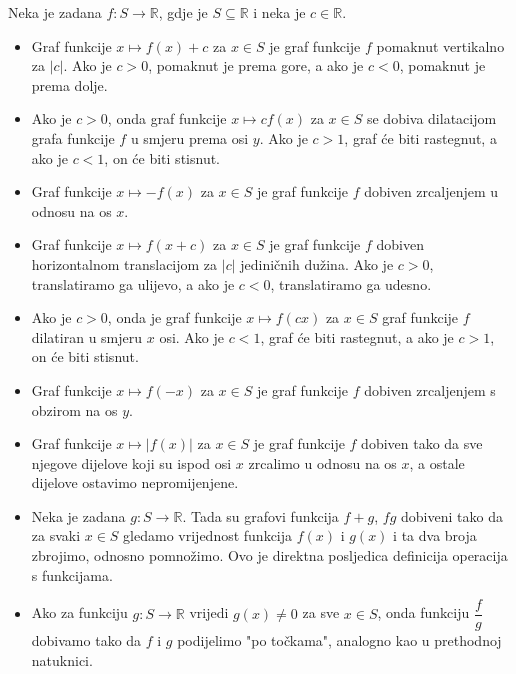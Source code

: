 \begin{remark}
\label{graphrem}
Neka je zadana \(f : S\to \mathbb{R}\), gdje je \(S\subseteq \mathbb{R}\) i neka je \(c\in \mathbb{R}\).
\begin{itemize}
\item Graf funkcije \(x\mapsto f(x)+c\) za \(x\in S\) je graf funkcije \(f\) pomaknut vertikalno za \(|c|\). Ako je \(c>0\), pomaknut je prema gore, a ako je \(c<0\), pomaknut je prema dolje.
\item Ako je \(c>0\), onda graf funkcije \(x\mapsto cf(x)\) za \(x\in S\) se dobiva dilatacijom grafa funkcije \(f\) u smjeru prema osi \(y\). Ako je \(c>1\), graf će biti rastegnut, a ako je \(c<1\), on će biti stisnut.
\item Graf funkcije \(x\mapsto -f(x)\) za \(x\in S\) je graf funkcije \(f\) dobiven zrcaljenjem u odnosu na os \(x\).
\item Graf funkcije \(x\mapsto f(x+c)\) za \(x\in S\) je graf funkcije \(f\) dobiven horizontalnom translacijom za \(|c|\) jediničnih dužina. Ako je \(c>0\), translatiramo ga ulijevo, a ako je \(c<0\), translatiramo ga udesno.
\item Ako je \(c>0\), onda je graf funkcije \(x\mapsto f(cx)\) za \(x\in S\) graf funkcije \(f\) dilatiran u smjeru \(x\) osi. Ako je \(c<1\), graf će biti rastegnut, a ako je \(c>1\), on će biti stisnut.
\item Graf funkcije \(x\mapsto f(-x)\) za \(x\in S\) je graf funkcije \(f\) dobiven zrcaljenjem s obzirom na os \(y\).
\item Graf funkcije \(x\mapsto |f(x)|\) za \(x\in S\) je graf funkcije \(f\) dobiven tako da sve njegove dijelove koji su ispod osi \(x\) zrcalimo u odnosu na os \(x\), a ostale dijelove ostavimo nepromijenjene.
\item Neka je zadana \(g : S\to \mathbb{R}\). Tada su grafovi funkcija \(f+g\), \(fg\) dobiveni tako da za svaki \(x\in S\) gledamo vrijednost funkcija \(f(x)\) i \(g(x)\) i ta dva broja zbrojimo, odnosno pomnožimo. Ovo je direktna posljedica definicija operacija s funkcijama.
\item Ako za funkciju \(g : S\to \mathbb{R}\) vrijedi \(g(x)\neq 0\) za sve \(x\in S\), onda funkciju \(\dfrac{f}{g}\) dobivamo tako da \(f\) i \(g\) podijelimo "po točkama", analogno kao u prethodnoj natuknici.
\end{itemize}
\end{remark}

